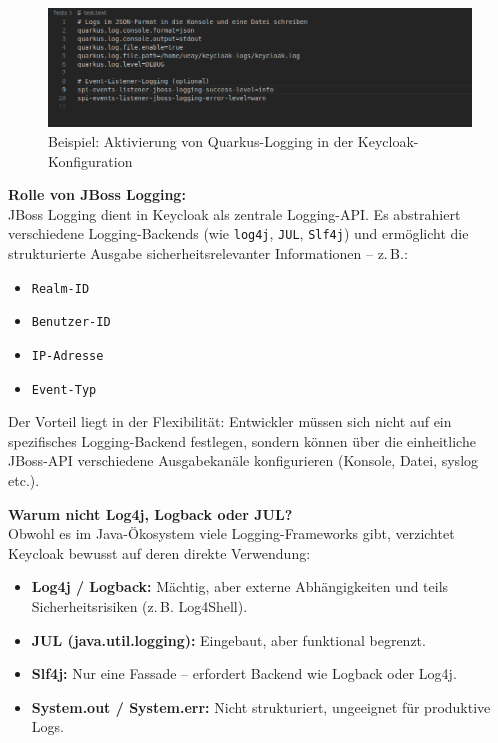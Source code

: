 \documentclass[a4paper,12pt]{article}
\begin{document}
	\begin{figure}[H]
		\centering
		\includegraphics[width=0.9\linewidth]{screenshot008}
		\caption{Beispiel: Aktivierung von Quarkus-Logging in der Keycloak-Konfiguration}
		\label{fig:screenshot008}
	\end{figure}
	
	\vspace{0.5em}
	\textbf{Rolle von JBoss Logging:}\\
	JBoss Logging dient in Keycloak als zentrale Logging-API. Es abstrahiert verschiedene Logging-Backends (wie \texttt{log4j}, \texttt{JUL}, \texttt{Slf4j}) und ermöglicht die strukturierte Ausgabe sicherheitsrelevanter Informationen – z.\,B.:
	\begin{itemize}
		\item \texttt{Realm-ID}
		\item \texttt{Benutzer-ID}
		\item \texttt{IP-Adresse}
		\item \texttt{Event-Typ}
	\end{itemize}
	
	Der Vorteil liegt in der Flexibilität: Entwickler müssen sich nicht auf ein spezifisches Logging-Backend festlegen, sondern können über die einheitliche JBoss-API verschiedene Ausgabekanäle konfigurieren (Konsole, Datei, syslog etc.).
	
	\vspace{0.5em}
	\textbf{Warum nicht Log4j, Logback oder JUL?}\\
	Obwohl es im Java-Ökosystem viele Logging-Frameworks gibt, verzichtet Keycloak bewusst auf deren direkte Verwendung:
	\begin{itemize}
		\item \textbf{Log4j / Logback:} Mächtig, aber externe Abhängigkeiten und teils Sicherheitsrisiken (z.\,B. Log4Shell).
		\item \textbf{JUL (java.util.logging):} Eingebaut, aber funktional begrenzt.
		\item \textbf{Slf4j:} Nur eine Fassade – erfordert Backend wie Logback oder Log4j.
		\item \textbf{System.out / System.err:} Nicht strukturiert, ungeeignet für produktive Logs.
	\end{itemize}
	
\end{document}
